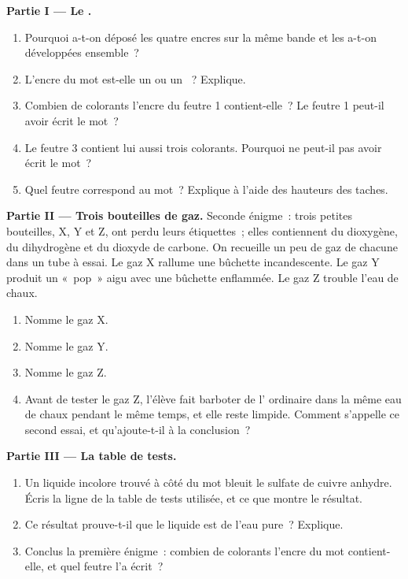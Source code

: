 \begin{problem}
\medskip
\noindent\textbf{Partie I --- Le .}
\begin{enumerate}
  \item Pourquoi a-t-on déposé les quatre encres sur la même bande et
        les a-t-on développées ensemble~?
  \item L'encre du mot est-elle un  ou un ~? Explique.
  \item Combien de colorants l'encre du feutre 1 contient-elle~? Le
        feutre 1 peut-il avoir écrit le mot~?
  \item Le feutre 3 contient lui aussi trois colorants. Pourquoi ne
        peut-il pas avoir écrit le mot~?
  \item Quel feutre correspond au mot~? Explique à l'aide des hauteurs
        des taches.
\end{enumerate}

\medskip
\noindent\textbf{Partie II --- Trois bouteilles de gaz.}
Seconde énigme~: trois petites bouteilles, X, Y et Z, ont perdu leurs
étiquettes~; elles contiennent du dioxygène, du dihydrogène et du
dioxyde de carbone. On recueille un peu de gaz de chacune dans un tube à
essai. Le gaz X rallume une bûchette incandescente. Le gaz Y produit un
«~pop~» aigu avec une bûchette enflammée. Le gaz Z trouble l'eau de
chaux.
\begin{enumerate}[resume]
  \item Nomme le gaz X.
  \item Nomme le gaz Y.
  \item Nomme le gaz Z.
  \item Avant de tester le gaz Z, l'élève fait barboter de l' ordinaire
        dans la même eau de chaux pendant le même temps, et elle reste
        limpide. Comment s'appelle ce second essai, et qu'ajoute-t-il à
        la conclusion~?
\end{enumerate}

\medskip
\noindent\textbf{Partie III --- La table de tests.}
\begin{enumerate}[resume]
  \item Un liquide incolore trouvé à côté du mot bleuit le sulfate de
        cuivre anhydre. Écris la ligne de la table de tests utilisée, et
        ce que montre le résultat.
  \item Ce résultat prouve-t-il que le liquide est de l'eau pure~?
        Explique.
  \item Conclus la première énigme~: combien de colorants l'encre du mot
        contient-elle, et quel feutre l'a écrit~?
\end{enumerate}
\end{problem}
